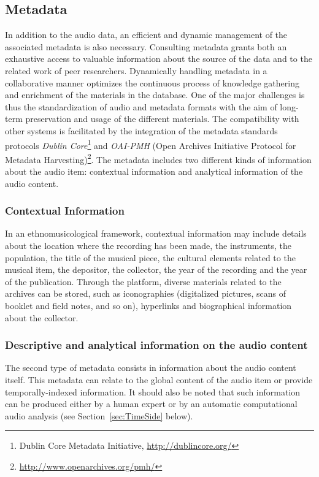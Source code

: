 \documentclass{sig-alternate}
\begin{document}
\subsection{Metadata}\label{sec:metadata}
In addition to the audio data, an efficient and dynamic management of the associated metadata is also necessary. Consulting metadata grants both an exhaustive access to valuable information about the source of the data and to the related work of peer researchers. 
Dynamically handling metadata in a collaborative manner optimizes the continuous process of knowledge gathering and enrichment of the materials in the database.  
One of the major challenges is thus the standardization of audio and metadata formats with the aim of long-term preservation and usage of the different materials.
The compatibility with other systems is facilitated by the integration of the metadata standards protocols \emph{Dublin Core}\footnote{{Dublin Core} Metadata Initiative, \url{http://dublincore.org/}} and \emph{OAI-PMH} (Open Archives Initiative Protocol for Metadata Harvesting)\footnote{\url{http://www.openarchives.org/pmh/}}.
The metadata includes two different kinds of information about the audio item: contextual information and analytical information of the audio content.
\subsubsection{Contextual Information}
In an ethnomusicological framework, contextual information may include details about the location where the recording has been made, the instruments, the population, the title of the musical piece, the cultural elements related to the musical item, the depositor, the collector, the year of the recording and the year of the publication. 
Through the platform, diverse materials related to the archives can be stored, such as iconographies (digitalized pictures, scans of booklet and field notes, and so on), hyperlinks and biographical information about the collector. 

\subsubsection{Descriptive and analytical information on the audio content}
The second type of metadata consists in information about the audio content itself. This metadata can relate to the global content of the audio item or provide temporally-indexed information. It should also be noted that such information can be produced either by a human expert or by an automatic computational audio analysis (see Section~\ref{sec:TimeSide} below).
\end{document}

